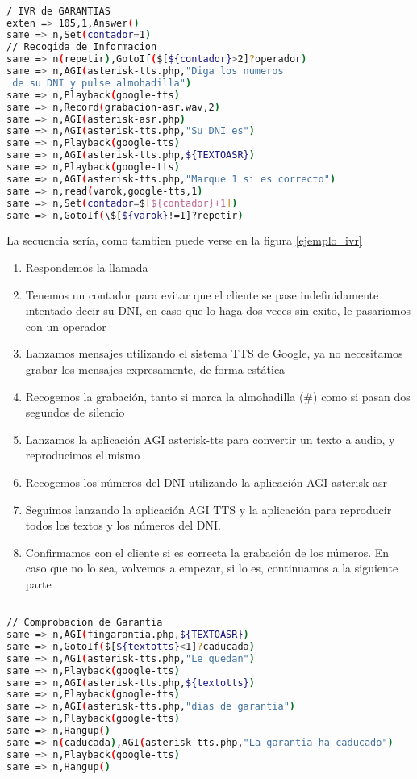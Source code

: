\begin{lstlisting}[language=bash,title={(/etc/asterisk/extensions.conf}]

/ IVR de GARANTIAS
exten => 105,1,Answer()
same => n,Set(contador=1)
// Recogida de Informacion
same => n(repetir),GotoIf($[${contador}>2]?operador)
same => n,AGI(asterisk-tts.php,"Diga los numeros
 de su DNI y pulse almohadilla")
same => n,Playback(google-tts)
same => n,Record(grabacion-asr.wav,2)
same => n,AGI(asterisk-asr.php)
same => n,AGI(asterisk-tts.php,"Su DNI es")
same => n,Playback(google-tts)
same => n,AGI(asterisk-tts.php,${TEXTOASR})
same => n,Playback(google-tts)
same => n,AGI(asterisk-tts.php,"Marque 1 si es correcto")
same => n,read(varok,google-tts,1)
same => n,Set(contador=$[${contador}+1])
same => n,GotoIf(\$[${varok}!=1]?repetir)

\end{lstlisting}

La secuencia sería, como tambien puede verse en la figura \ref{ejemplo_ivr}

\begin{enumerate}
	\item Respondemos la llamada
	\item Tenemos un contador para evitar que el cliente se pase indefinidamente intentado decir su DNI, en caso que lo haga dos veces sin exito, le pasariamos con un operador
	\item Lanzamos mensajes utilizando el sistema TTS de Google, ya no necesitamos grabar los mensajes expresamente, de forma estática
	\item Recogemos la grabación, tanto si marca la almohadilla (\#) como si pasan dos segundos de silencio
	\item Lanzamos la aplicación AGI asterisk-tts para convertir un texto a audio, y reproducimos el mismo
	\item Recogemos los números del DNI utilizando la aplicación AGI asterisk-asr
	\item Seguimos lanzando la aplicación AGI TTS y la aplicación para reproducir todos los textos y los números del DNI.
	\item Confirmamos con el cliente si es correcta la grabación de los números. En caso que no lo sea, volvemos a empezar, si lo es, continuamos a la siguiente parte
\end{enumerate}


\begin{lstlisting}[language=bash,title={(/etc/asterisk/extensions.conf}]

// Comprobacion de Garantia
same => n,AGI(fingarantia.php,${TEXTOASR})
same => n,GotoIf($[${textotts}<1]?caducada)
same => n,AGI(asterisk-tts.php,"Le quedan")
same => n,Playback(google-tts)
same => n,AGI(asterisk-tts.php,${textotts})
same => n,Playback(google-tts)
same => n,AGI(asterisk-tts.php,"dias de garantia")
same => n,Playback(google-tts)
same => n,Hangup()
same => n(caducada),AGI(asterisk-tts.php,"La garantia ha caducado")
same => n,Playback(google-tts)
same => n,Hangup()

\end{lstlisting}

